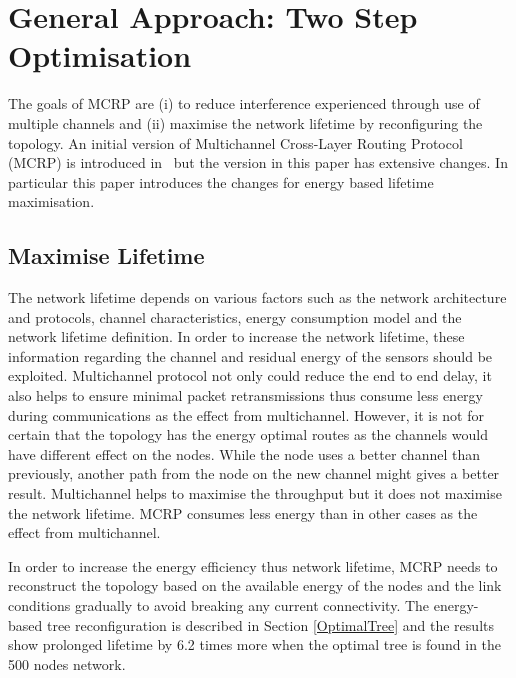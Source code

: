 
\section{General Approach: Two Step Optimisation}
\label{ProblemFormulation}

The goals of MCRP are (i) to reduce interference experienced through use of multiple channels and (ii) maximise the network lifetime by reconfiguring the topology. 
An initial version of Multichannel Cross-Layer Routing Protocol (MCRP) is introduced in~\cite{mcrp} but the version in this paper has extensive changes.  In particular this paper introduces the changes for energy based lifetime maximisation.

\subsection{Maximise Lifetime}

The network lifetime depends on various factors such as the network architecture and protocols, channel characteristics, energy consumption model and the network lifetime definition. In order to increase the network lifetime, these information regarding the channel and residual energy of the sensors should be exploited.
Multichannel protocol not only could reduce the end to end delay, it also helps to ensure minimal packet retransmissions thus consume less energy during communications as the effect from multichannel. However, it is not for certain that the topology has the energy optimal routes as the channels would have different effect on the nodes. While the node uses a better channel than previously, another path from the node on the new channel might gives a better result. 
Multichannel helps to maximise the throughput but it does not maximise the network lifetime.
MCRP consumes less energy than in other cases as the effect from multichannel. 

In order to increase the energy efficiency thus network lifetime, MCRP needs to reconstruct the topology based on the available energy of the nodes and the link conditions gradually to avoid breaking any current connectivity. The energy-based tree reconfiguration is described in Section \ref{OptimalTree} and the results show prolonged lifetime by 6.2 times more when the optimal tree is found in the 500 nodes network.
